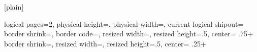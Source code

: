[plain]
\usepackage{pgfpages}

\makeatletter
{}%
{\def\pgfpageoptionhshift{#1}}
%
{\def\pgfpageoptionvshift{#1}}
\makeatother
{}
{
	\edef\pgfpageoptionheight{\the\paperwidth} %
	\edef\pgfpageoptionwidth{\the\paperheight}
	\def\pgfpageoptionborder{0pt}
	\def\pgfpageoptionfirstshipout{1}
	\def\pgfpageoptionhshift{0pt}
	\def\pgfpageoptionvshift{0pt}
}
{
	\pgfpagesphysicalpageoptions
	{%
		logical pages=2,%
		physical height=\pgfpageoptionheight,%
		physical width=\pgfpageoptionwidth,%
		current logical shipout=\pgfpageoptionfirstshipout%
	}
	{%
		border shrink=\pgfpageoptionborder,%
		border code=,%
		resized width=\pgfphysicalwidth,%
		resized height=.5\pgfphysicalheight,%
		center=\pgfpoint{.5\pgfphysicalwidth+\pgfpageoptionhshift}%
		{.75\pgfphysicalheight+\pgfpageoptionvshift}%
	}%
	{%
		border shrink=\pgfpageoptionborder,%
		resized width=\pgfphysicalwidth,%
		resized height=.5\pgfphysicalheight,%
		center=\pgfpoint{.5\pgfphysicalwidth+\pgfpageoptionhshift}%
		{.25\pgfphysicalheight+\pgfpageoptionvshift}%
	}%
}

\usepackage{ifthen}
%
